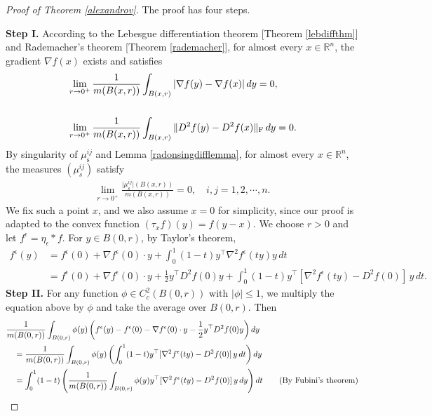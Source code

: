 \documentclass{article}
\numberwithin{equation}{section}
\newcommand{\bbR}{\mathbb{R}}
\theoremstyle{plain}
\theoremstyle{definition}
\begin{document}
\begin{proof}[Proof of Theorem \ref{alexandrov}]
The proof has four steps.
\item\textbf{Step I.} According to the Lebesgue differentiation theorem [Theorem \ref{lebdiffthm}] and Rademacher's theorem [Theorem \ref{rademacher}], for almost every $x\in\bbR^n$, the gradient $\nabla f(x)$ exists and satisfies
\begin{align}
&\lim_{r\to 0^+}\frac{1}{m(B(x,r))}\int_{B(x,r)}\vert\nabla f(y)-\nabla f(x)\vert\,dy=0,\label{alexandrovgradest}\\
&\hspace{-4.30cm}\text{and}\notag\\
&\lim_{r\to 0^+}\frac{1}{m(B(x,r))}\int_{B(x,r)}\Vert D^2f(y)-D^2f(x)\Vert_\mathrm{F}\,dy=0.\label{alexandrovhessest}
\end{align}
By singularity of $\mu_\mathrm{s}^{ij}$ and Lemma \ref{radonsingdifflemma}, for almost every $x\in\bbR^n$, the measures $(\mu_s^{ij})$ satisfy
\begin{align}
\lim_{r\to 0^+}\frac{\vert\mu_\mathrm{s}^{ij}\vert(B(x,r))}{m(B(x,r))}=0,\quad i,j=1,2,\cdots,n.\label{alexandrovsingest}
\end{align}
We fix such a point $x$, and we also assume $x=0$ for simplicity, since our proof is adapted to the convex function $(\tau_xf)(y)=f(y-x)$. We choose $r>0$ and let $f^\epsilon=\eta_\epsilon*f$. For $y\in B(0,r)$, by Taylor's theorem,
\begin{align*}
	f^\epsilon(y)&=f^\epsilon(0)+\nabla f^\epsilon(0)\cdot y+\int_0^1(1-t)y^\top \nabla^2f^\epsilon(ty)y\,dt\\
	&=f^\epsilon(0)+\nabla f^\epsilon(0)\cdot y+\frac{1}{2}y^\top D^2f(0)y+\int_0^1(1-t)y^\top[\nabla^2f^\epsilon(ty)-D^2f(0)]\,y\,dt.
\end{align*}
\textbf{Step II.} For any function $\phi\in C_c^2(B(0,r))$ with $\vert\phi\vert\leq 1$, we multiply the equation above by $\phi$ and take the average over $B(0,r)$. Then
\begin{align}\label{convextaylor2est}
	&\frac{1}{m(B(0,r))}\int_{B(0,r)}\phi(y)\left(f^\epsilon(y)-f^\epsilon(0)-\nabla f^\epsilon(0)\cdot y-\frac{1}{2}y^\top D^2f(0)y\right)dy\notag\\
	&\quad=\frac{1}{m(B(0,r))}\int_{B(0,r)}\phi(y)\left(\int_0^1(1-t)y^\top[\nabla^2f^\epsilon(ty)-D^2f(0)]\,y\,dt\right)dy\\
	&\quad=\int_0^1(1-t)\left(\frac{1}{m(B(0,r))}\int_{B(0,r)}\phi(y)y^\top[\nabla^2f^\epsilon(ty)-D^2f(0)]\,y\,dy\right)dt\tag{By Fubini's theorem}\\

\end{align}
\end{proof}
\end{document}
